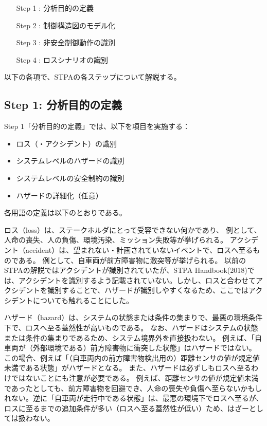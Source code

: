 \begin{enumerate}
    \item[Step 1]: 分析目的の定義
    \item[Step 2]: 制御構造図のモデル化
    \item[Step 3]: 非安全制御動作の識別
    \item[Step 4]: ロスシナリオの識別
\end{enumerate}

以下の各項で、STPAの各ステップについて解説する。

\subsection{Step 1: 分析目的の定義}

Step 1「分析目的の定義」では、以下を項目を実施する： %

\begin{itemize}
    \item ロス（・アクシデント）の識別
    \item システムレベルのハザードの識別
    \item システムレベルの安全制約の識別
    \item ハザードの詳細化（任意）
\end{itemize}

各用語の定義は以下のとおりである。 %

ロス（loss）は、ステークホルダにとって受容できない何かであり、
例として、人命の喪失、人の負傷、環境汚染、ミッション失敗等が挙げられる。
アクシデント（accident）は、望まれない・計画されていないイベントで、ロスへ至るものである。
例として、自車両が前方障害物に激突等が挙げられる。
以前のSTPAの解説ではアクシデントが識別されていたが、STPA Handbook(2018)では、アクシデントを識別するよう記載されていない。しかし、ロスと合わせてアクシデントを識別することで、ハザードが識別しやすくなるため、ここではアクシデントについても触れることにした。

ハザード（hazard）は、システムの状態または条件の集まりで、最悪の環境条件下で、ロスへ至る蓋然性が高いものである。
なお、ハザードはシステムの状態または条件の集まりであるため、システム境界外を直接扱わない。
例えば、「自車両が（外部環境である）前方障害物に衝突した状態」はハザードではない。
この場合、例えば「（自車両内の前方障害物検出用の）距離センサの値が規定値未満である状態」がハザードとなる。
また、ハザードは必ずしもロスへ至るわけではないことにも注意が必要である。
例えば、距離センサの値が規定値未満であったとしても、前方障害物を回避でき、人命の喪失や負傷へ至らないかもしれない。逆に「自車両が走行中である状態」は、最悪の環境下でロスへ至るが、ロスに至るまでの追加条件が多い（ロスへ至る蓋然性が低い）ため、はざーとしては扱わない。


